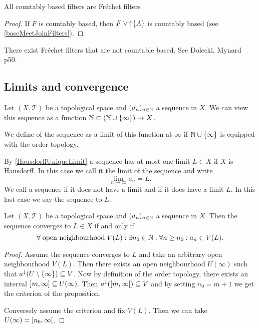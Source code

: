 \begin{corollary} \label{countablyBasedFiltersFrechet}
All countably based filters are Fréchet filters
\end{corollary}
\begin{proof}
If $F$ is countably based, then $F\vee \operatorname{\uparrow}\{A\}$ is countably based (see \ref{baseMeetJoinFilters}).
\end{proof}

\begin{example}
There exist Fréchet filters that are not countable based. See Dolecki, Mynard p50.
\end{example}


\subsection{Limits and convergence}
\begin{definition}
Let $(X,\mathcal{T})$ be a topological space and $(a_n)_{n\in\mathbb{N}}$ a sequence in $X$. We can view this sequence as a function $\mathbb{N}\subset (\mathbb{N}\cup\{\infty\})\to X$.

We define  of the sequence as a limit of this function at $\infty$ if $\mathbb{N}\cup\{\infty\}$ is equipped with the order topology.
\end{definition}
By \ref{HausdorffUniqueLimit} a sequence has at most one limit $L\in X$ if $X$ is Hausdorff. In this case we call it the limit of the sequence and write
\[ \lim_{n\to \infty}a_n = L. \]
We call a sequence  if it does not have a limit and
  if it does have a limit $L$. In this last case we say the sequence  to $L$.

\begin{proposition} \label{sequenceConvergence}
Let $(X,\mathcal{T})$ be a topological space and $(a_n)_{n\in\mathbb{N}}$ a sequence in $X$. Then the sequence converges to $L\in X$ \textup{if and only if}
\[ \forall \;\text{open neighbourhood}\; V(L): \exists n_0\in \mathbb{N}: \forall n\geq n_0: a_n\in V(L). \]
\end{proposition}
\begin{proof}
Assume the sequence converges to $L$ and take an arbitrary open neighbourhood $V(L)$. Then there exists an open neighbourhood $U(\infty)$ such that $a^{\downarrow}(U\setminus\{\infty\}) \subseteq V$. Now by definition of the order topology, there exists an interval $\interval[oc]{m, \infty}\subseteq U(\infty)$. Then $a^{\imf}(\interval[co]{m, \infty}) \subseteq V$ and by setting $n_0=m+1$ we get the criterion of the proposition.

Conversely assume the criterion and fix $V(L)$. Then we can take $U(\infty)=\interval[co]{n_0, \infty}$.
\end{proof}

